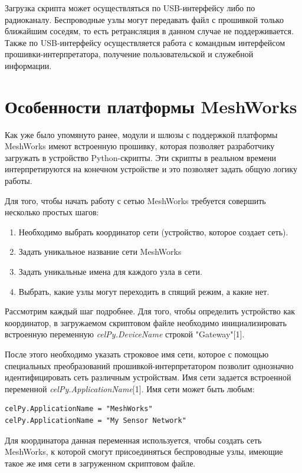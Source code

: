 \documentclass[11pt]{article}
\begin{document}
Загрузка скрипта может осуществляться по USB-интерфейсу либо по радиоканалу. Беспроводные
узлы могут передавать файл с прошивкой только ближайшим соседям, то есть ретрансляция 
в данном случае не поддерживается. Также по USB-интерфейсу осуществляется работа с
командным интерфейсом прошивки-интерпретатора, получение пользовательской и служебной
информации.

\section*{Особенности платформы MeshWorks}

Как уже было упомянуто ранее, модули и шлюзы с поддержкой платформы MeshWorks имеют
встроенную прошивку, которая позволяет разработчику загружать в устройство Python-скрипты.
Эти скрипты в реальном времени интерпретируются на конечном устройстве и это позволяет
задать общую логику работы.

Для того, чтобы начать работу с сетью MeshWorks требуется совершить несколько простых шагов:
\begin{enumerate}
    \item Необходимо выбрать координатор сети (устройство, которое создает сеть).
    \item Задать уникальное название сети MeshWorks
    \item Задать уникальные имена для каждого узла в сети.
    \item Выбрать, какие узлы могут переходить в спящий режим, а какие нет.
\end{enumerate}

Рассмотрим каждый шаг подробнее. Для того, чтобы определить устройство как координатор,
в загружаемом скриптовом файле необходимо инициализировать встроенную переменную 
\emph{celPy.DeviceName} строкой "Gateway"[1].

После этого необходимо указать строковое имя сети, которое с помощью специальных 
преобразований прошивкой-интерпретатором позволит однозначно идентифицировать сеть 
различным устройствам. Имя сети задается встроенной переменной \emph{celPy.ApplicationName}[1].
Имя сети может быть любым:
\begin{verbatim}
celPy.ApplicationName = "MeshWorks"
celPy.ApplicationName = "My Sensor Network"
\end{verbatim}

Для координатора данная переменная используется, чтобы создать сеть MeshWorks, к
которой смогут присоединяться беспроводные узлы, имеющие такое же имя сети в загруженном
скриптовом файле.
\end{document}
